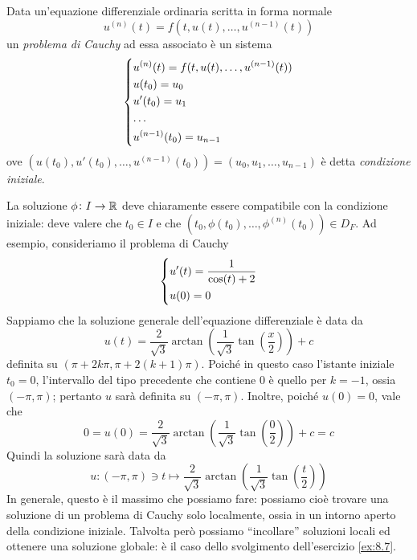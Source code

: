 \begin{definition}
    \label{def:11.3}
    Data un'equazione differenziale ordinaria scritta in forma normale
    \[
    u^{(n)}(t) = f(t, u(t), \dots, u^{(n-1)}(t))
    \]
    un \emph{problema di Cauchy} ad essa associato è un sistema
    \[
    \begin{dcases}
        u^{(n)}(t) = f(t, u(t), \dots, u^{(n-1)}(t))\\
        u(t_0) = u_0\\
        u'(t_0) = u_1\\
        \dots\\
        u^{(n-1)}(t_0) = u_{n-1}
    \end{dcases}
    \]
    ove $(u(t_0), u'(t_0), \dots, u^{(n-1)}(t_0)) = (u_0, u_1, \dots, u_{n-1})$ è detta \emph{condizione iniziale}.
\end{definition}
\begin{remark}
    La soluzione $\phi\colon I \to \amsbb{R}$ deve chiaramente essere compatibile con la condizione iniziale: deve valere che $t_0\in I$ e che $(t_0, \phi(t_0), \dots, \phi^{(n)}(t_0))\in D_F$. Ad esempio, consideriamo il problema di Cauchy
    \[
    \begin{dcases}
        u'(t) = \frac{1}{\cos(t)+2}\\
        u(0) = 0
    \end{dcases}
    \]
    Sappiamo che la soluzione generale dell'equazione differenziale è data da
    \[
    u(t) = \frac{2}{\sqrt{3}}\arctan\left(\frac{1}{\sqrt{3}}\tan\left(\frac{x}{2}\right)\right)+c
    \]
    definita su $(\pi +2k\pi, \pi + 2(k+1)\pi)$. Poiché in questo caso l'istante iniziale $t_0=0$, l'intervallo del tipo precedente che contiene $0$ è quello per $k=-1$, ossia $(-\pi, \pi)$; pertanto $u$ sarà definita su $(-\pi, \pi)$. Inoltre, poiché $u(0) = 0$, vale che
    \[
    0=u(0) = \frac{2}{\sqrt{3}}\arctan\left(\frac{1}{\sqrt{3}}\tan\left(\frac{0}{2}\right)\right)+c = c
    \]
    Quindi la soluzione sarà data da
    \[
    u\colon (-\pi, \pi)\ni t \mapsto \frac{2}{\sqrt{3}}\arctan\left(\frac{1}{\sqrt{3}}\tan\left(\frac{t}{2}\right)\right)
    \]
    In generale, questo è il massimo che possiamo fare: possiamo cioè trovare una soluzione di un problema di Cauchy solo localmente, ossia in un intorno aperto della condizione iniziale. Talvolta però possiamo ``incollare'' soluzioni locali ed ottenere una soluzione globale: è il caso dello svolgimento dell'esercizio \ref{ex:8.7}.
\end{remark}
